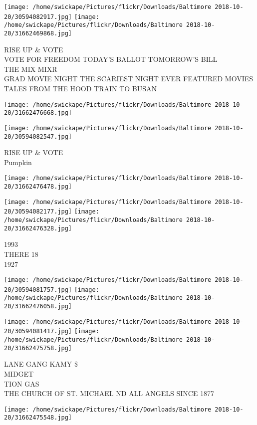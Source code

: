 \documentclass[10pt,letterpaper]{article}
\begin{document}
\texttt{[image: /home/swickape/Pictures/flickr/Downloads/Baltimore 2018-10-20/30594082917.jpg]}
\texttt{[image: /home/swickape/Pictures/flickr/Downloads/Baltimore 2018-10-20/31662469868.jpg]}

RISE UP \& VOTE\\
VOTE FOR FREEDOM TODAY'S BALLOT TOMORROW'S BILL\\
THE MIX MIXR\\
GRAD MOVIE NIGHT THE SCARIEST NIGHT EVER FEATURED MOVIES TALES FROM THE HOOD TRAIN TO BUSAN
\pagebreak

\texttt{[image: /home/swickape/Pictures/flickr/Downloads/Baltimore 2018-10-20/31662476668.jpg]}

\vspace{0.25in}
\texttt{[image: /home/swickape/Pictures/flickr/Downloads/Baltimore 2018-10-20/30594082547.jpg]}

RISE UP \& VOTE\\
Pumpkin
\pagebreak

\texttt{[image: /home/swickape/Pictures/flickr/Downloads/Baltimore 2018-10-20/31662476478.jpg]}

\vspace{0.25in}
\texttt{[image: /home/swickape/Pictures/flickr/Downloads/Baltimore 2018-10-20/30594082177.jpg]}
\texttt{[image: /home/swickape/Pictures/flickr/Downloads/Baltimore 2018-10-20/31662476328.jpg]}

1993\\
THERE 18\\
1927
\pagebreak

\texttt{[image: /home/swickape/Pictures/flickr/Downloads/Baltimore 2018-10-20/30594081757.jpg]}
\texttt{[image: /home/swickape/Pictures/flickr/Downloads/Baltimore 2018-10-20/31662476058.jpg]}

\texttt{[image: /home/swickape/Pictures/flickr/Downloads/Baltimore 2018-10-20/30594081417.jpg]}
\texttt{[image: /home/swickape/Pictures/flickr/Downloads/Baltimore 2018-10-20/31662475758.jpg]}

LANE GANG KAMY \$\\
MIDGET\\
TION GAS\\
THE CHURCH OF ST. MICHAEL ND ALL ANGELS SINCE 1877
\pagebreak

\texttt{[image: /home/swickape/Pictures/flickr/Downloads/Baltimore 2018-10-20/31662475548.jpg]}
\end{document}
